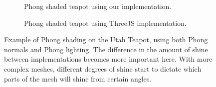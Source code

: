 \documentclass[10pt,twocolumn,letterpaper]{article}
\begin{document}
\begin{figure}
    \centering
    \begin{subfigure}{.48\linewidth}
        \caption{Phong shaded teapot using our implementation.}
        \label{fig:our-phong-tea}
    \end{subfigure}
    \hfill
    \begin{subfigure}{.48\linewidth}
        \caption{Phong shaded teapot using ThreeJS implementation.}
        \label{fig:three-phong-tea}
    \end{subfigure}
    \caption{Example of Phong shading on the Utah Teapot, using both Phong normals and Phong lighting. The difference in the amount of shine between implementations becomes more important here. With more complex meshes, different degrees of shine start to dictate which parts of the mesh will shine from certain angles.}
    \label{fig:phong-tea}
\end{figure}
\end{document}
